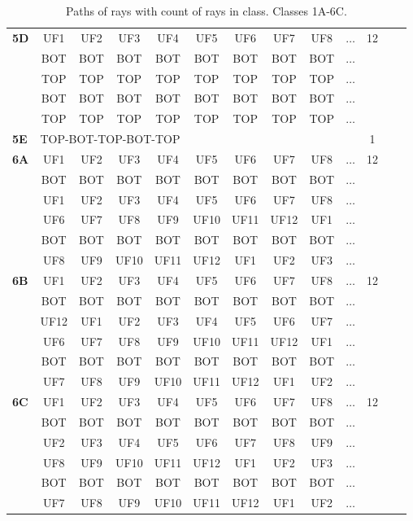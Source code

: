 \begin{table}[h!]
\begin{tabular}{|l|c|c|c|c|c|c|c|c|c|c|c|c|}
\textbf{5D} & UF1 & UF2 & UF3 & UF4 & UF5 & UF6 & UF7 & UF8 & $\dots$ & 12\\
 & BOT & BOT & BOT & BOT & BOT & BOT & BOT & BOT & $\dots$ & \\
 & TOP & TOP & TOP & TOP & TOP & TOP & TOP & TOP & $\dots$ & \\
 & BOT & BOT & BOT & BOT & BOT & BOT & BOT & BOT & $\dots$ & \\
 & TOP & TOP & TOP & TOP & TOP & TOP & TOP & TOP & $\dots$ & \\
\hline \hline
\textbf{5E} & \multicolumn{9}{l}{TOP-BOT-TOP-BOT-TOP} \vline  & 1\\
\hline \hline
\textbf{6A} & UF1 & UF2 & UF3 & UF4 & UF5 & UF6 & UF7 & UF8 & $\dots$ & 12\\
 & BOT & BOT & BOT & BOT & BOT & BOT & BOT & BOT & $\dots$ & \\
 & UF1 & UF2 & UF3 & UF4 & UF5 & UF6 & UF7 & UF8 & $\dots$ & \\
 & UF6 & UF7 & UF8 & UF9 & UF10 & UF11 & UF12 & UF1 & $\dots$ & \\
 & BOT & BOT & BOT & BOT & BOT & BOT & BOT & BOT & $\dots$ & \\
 & UF8 & UF9 & UF10 & UF11 & UF12 & UF1 & UF2 & UF3 & $\dots$ & \\
\hline \hline
\textbf{6B} & UF1 & UF2 & UF3 & UF4 & UF5 & UF6 & UF7 & UF8 & $\dots$ & 12\\
 & BOT & BOT & BOT & BOT & BOT & BOT & BOT & BOT & $\dots$ & \\
 & UF12 & UF1 & UF2 & UF3 & UF4 & UF5 & UF6 & UF7 & $\dots$ & \\
 & UF6 & UF7 & UF8 & UF9 & UF10 & UF11 & UF12 & UF1 & $\dots$ & \\
 & BOT & BOT & BOT & BOT & BOT & BOT & BOT & BOT & $\dots$ & \\
 & UF7 & UF8 & UF9 & UF10 & UF11 & UF12 & UF1 & UF2 & $\dots$ & \\
\hline \hline
\textbf{6C} & UF1 & UF2 & UF3 & UF4 & UF5 & UF6 & UF7 & UF8 & $\dots$ & 12\\
 & BOT & BOT & BOT & BOT & BOT & BOT & BOT & BOT & $\dots$ & \\
 & UF2 & UF3 & UF4 & UF5 & UF6 & UF7 & UF8 & UF9 & $\dots$ & \\
 & UF8 & UF9 & UF10 & UF11 & UF12 & UF1 & UF2 & UF3 & $\dots$ & \\
 & BOT & BOT & BOT & BOT & BOT & BOT & BOT & BOT & $\dots$ & \\
 & UF7 & UF8 & UF9 & UF10 & UF11 & UF12 & UF1 & UF2 & $\dots$ & \\
\hline 
\end{tabular}
\caption{Paths of rays with count of rays in class. Classes 1A-6C.}
\label{table:TableClasses1}
\end{table}




